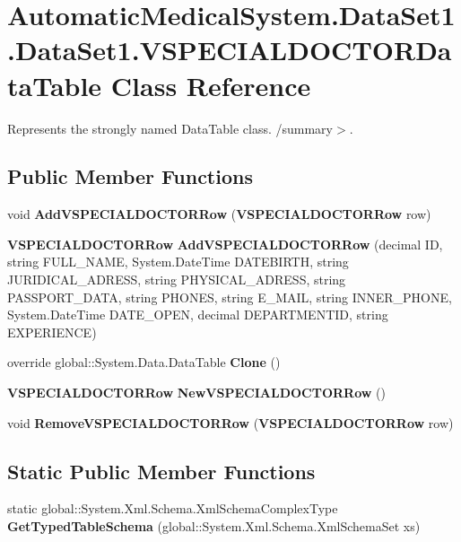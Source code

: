 \section{AutomaticMedicalSystem.DataSet1.DataSet1.VSPECIALDOCTORDataTable Class Reference}
\label{class_automatic_medical_system_1_1_data_set1_1_1_v_s_p_e_c_i_a_l_d_o_c_t_o_r_data_table}
Represents the strongly named DataTable class. /summary$>$.  


\subsection*{Public Member Functions}
\begin{CompactItemize}
\item 
void \textbf{AddVSPECIALDOCTORRow} ({\bf VSPECIALDOCTORRow} row)\label{class_automatic_medical_system_1_1_data_set1_1_1_v_s_p_e_c_i_a_l_d_o_c_t_o_r_data_table_54104888a782431c34fadd5a5ef1e85a}

\item 
{\bf VSPECIALDOCTORRow} \textbf{AddVSPECIALDOCTORRow} (decimal ID, string FULL\_\-NAME, System.DateTime DATEBIRTH, string JURIDICAL\_\-ADRESS, string PHYSICAL\_\-ADRESS, string PASSPORT\_\-DATA, string PHONES, string E\_\-MAIL, string INNER\_\-PHONE, System.DateTime DATE\_\-OPEN, decimal DEPARTMENTID, string EXPERIENCE)\label{class_automatic_medical_system_1_1_data_set1_1_1_v_s_p_e_c_i_a_l_d_o_c_t_o_r_data_table_e8643279cddd6d1b9f50bdb6196f7b4b}

\item 
override global::System.Data.DataTable \textbf{Clone} ()\label{class_automatic_medical_system_1_1_data_set1_1_1_v_s_p_e_c_i_a_l_d_o_c_t_o_r_data_table_4897bf16a8bb373f5717468df8ac0ccb}

\item 
{\bf VSPECIALDOCTORRow} \textbf{NewVSPECIALDOCTORRow} ()\label{class_automatic_medical_system_1_1_data_set1_1_1_v_s_p_e_c_i_a_l_d_o_c_t_o_r_data_table_84bde44a23987a4a9c86327cc1423ae1}

\item 
void \textbf{RemoveVSPECIALDOCTORRow} ({\bf VSPECIALDOCTORRow} row)\label{class_automatic_medical_system_1_1_data_set1_1_1_v_s_p_e_c_i_a_l_d_o_c_t_o_r_data_table_2180d0537fc7c70e1a277749a7ff265f}

\end{CompactItemize}
\subsection*{Static Public Member Functions}
\begin{CompactItemize}
\item 
static global::System.Xml.Schema.XmlSchemaComplexType \textbf{GetTypedTableSchema} (global::System.Xml.Schema.XmlSchemaSet xs)\label{class_automatic_medical_system_1_1_data_set1_1_1_v_s_p_e_c_i_a_l_d_o_c_t_o_r_data_table_164cc6734bf95d9ef0830a91f53ca181}

\end{CompactItemize}

